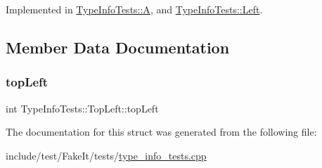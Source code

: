 Implemented in \mbox{\hyperlink{structTypeInfoTests_1_1A_a409df9b333807d1ec1f1005522a3f29b}{Type\+Info\+Tests\+::A}}, and \mbox{\hyperlink{structTypeInfoTests_1_1Left_afb4d9ad3c054e9339eb5dd2b18d2f347}{Type\+Info\+Tests\+::\+Left}}.



\subsection{Member Data Documentation}
\mbox{\label{structTypeInfoTests_1_1TopLeft_a68d4ff27ddabdf320b8c0b64735888f7}} 
\subsubsection{\texorpdfstring{topLeft}{topLeft}}
{\footnotesize\ttfamily int Type\+Info\+Tests\+::\+Top\+Left\+::top\+Left}



The documentation for this struct was generated from the following file\+:\begin{DoxyCompactItemize}
\item 
include/test/\+Fake\+It/tests/\mbox{\hyperlink{type__info__tests_8cpp}{type\+\_\+info\+\_\+tests.\+cpp}}\end{DoxyCompactItemize}
